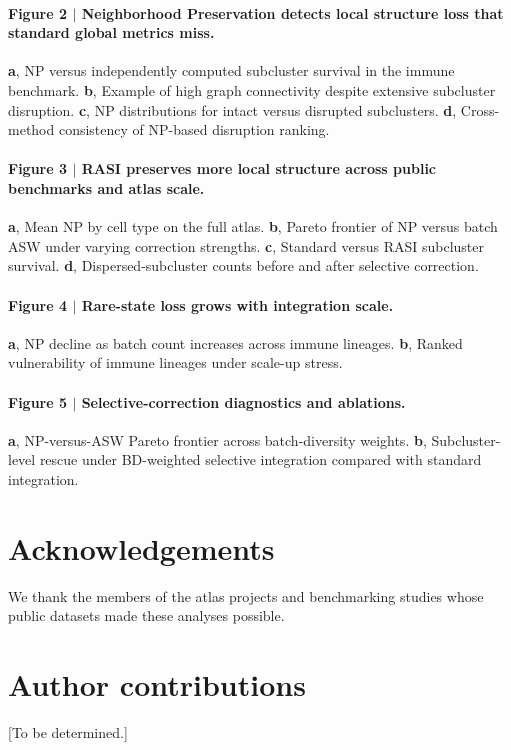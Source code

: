 \documentclass[10pt]{article}
\begin{document}
\paragraph{Figure 2 $|$ Neighborhood Preservation detects local structure loss that standard global metrics miss.}
\textbf{a}, NP versus independently computed subcluster survival in the immune benchmark.
\textbf{b}, Example of high graph connectivity despite extensive subcluster disruption.
\textbf{c}, NP distributions for intact versus disrupted subclusters.
\textbf{d}, Cross-method consistency of NP-based disruption ranking.

\paragraph{Figure 3 $|$ RASI preserves more local structure across public benchmarks and atlas scale.}
\textbf{a}, Mean NP by cell type on the full atlas.
\textbf{b}, Pareto frontier of NP versus batch ASW under varying correction strengths.
\textbf{c}, Standard versus RASI subcluster survival.
\textbf{d}, Dispersed-subcluster counts before and after selective correction.

\paragraph{Figure 4 $|$ Rare-state loss grows with integration scale.}
\textbf{a}, NP decline as batch count increases across immune lineages.
\textbf{b}, Ranked vulnerability of immune lineages under scale-up stress.

\paragraph{Figure 5 $|$ Selective-correction diagnostics and ablations.}
\textbf{a}, NP-versus-ASW Pareto frontier across batch-diversity weights.
\textbf{b}, Subcluster-level rescue under BD-weighted selective integration compared with standard integration.

\section*{Acknowledgements}
We thank the members of the atlas projects and benchmarking studies whose public datasets made these analyses possible.

\section*{Author contributions}
[To be determined.]
\end{document}
